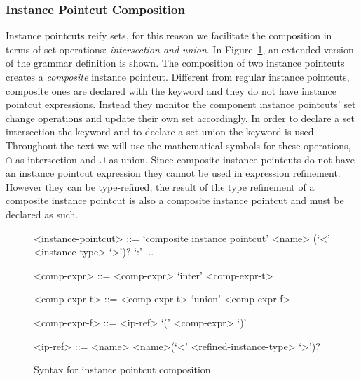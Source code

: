 \subsubsection{Instance Pointcut Composition}
\label{sect:compo}

Instance pointcuts reify sets, for this reason we facilitate the composition in terms of set operations: \emph{intersection and union}.
In Figure~\ref{fig:grammar2}, an extended version of the grammar definition is shown.
The composition of two instance pointcuts creates a \emph{composite} instance pointcut. Different from regular instance pointcuts, composite ones are declared with the keyword  and they do not have instance pointcut expressions. Instead they monitor the component instance pointcuts' set change operations and update their own set accordingly.
In order to declare a set intersection the keyword  and to declare a set union the keyword  is used. Throughout the text we will use the mathematical symbols for these operations, $\cap$ as intersection and $\cup$ as union. Since composite instance pointcuts do not have an instance pointcut expression they cannot be used in expression refinement. However they can be type-refined; the result of the type refinement of a composite instance pointcut is also a composite instance pointcut and must be declared as such.

\begin{figure}[h]
\begin{grammar}
<instance-pointcut> ::= `composite instance pointcut' <name> (`<' <instance-type> `>')? `:'
... 

<comp-expr> ::= <comp-expr> `inter' <comp-expr-t>  

<comp-expr-t> ::= <comp-expr-t> `union' <comp-expr-f>  

<comp-expr-f> ::= <ip-ref> \alt `(' <comp-expr> `)'

<ip-ref> ::= <name> \alt <name>(`<' <refined-instance-type> `>')?

\end{grammar}
\caption{Syntax for instance pointcut composition}
\label{fig:grammar2}
\end{figure}


